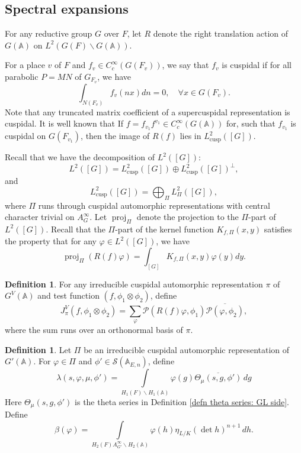 \documentclass[11pt, reqno]{amsart}
\numberwithin{equation}{subsection}
\theoremstyle{plain}
\theoremstyle{definition}
\newtheorem{definition}[proposition]{Definition}
\newcommand{\bs}{\backslash}
\renewcommand{\AA}{\mathbb A}
\newcommand{\ol}{\overline}
\renewcommand{\P}{\mathcal P}
\newcommand{\cS}{\mathcal S}
\begin{document}
\subsection{Spectral expansions}

For any reductive group $G$ over $F$, let $R$ denote the right translation action of
$G(\AA)$ on $L^2(G(F)\bs G(\AA))$.

For a place $v$ of $F$ and $f_{v} \in C_c^\infty(G(F_v))$, we say that $f_v$ is  cuspidal if for all parabolic $P=MN$ of $G_{F_v}$, we have
\[
    \int_{N(F_v)} f_v(nx) dn = 0, \quad \forall x \in G(F_v).
\]
Note that any truncated matrix coefficient of a supercuspidal representation is cuspidal. It is well known that  If $f = f_{v_1}f^{v_1} \in C_c^\infty(G(\AA))$ for, such that $f_{v_1}$ is cuspidal on $G(F_{v_1})$, then the image of $R(f)$ lies in $L^2_{\mathrm{cusp}}([G])$. 

Recall that we have the decomposition of $L^2([G])$:
\[
    L^2([G]) = L^2_{\operatorname{cusp}}([G]) \oplus L^2_{\operatorname{cusp}}([G])^\perp,
\]
and
\[
    L^2_{\operatorname{cusp}}([G]) = \bigoplus_{\Pi} L^2_\Pi([G]),
\]
where $\Pi$ runs through cuspidal automorphic representations with central character trivial on $A_{G}^\infty$. Let $\operatorname{proj}_{\Pi}$ denote the projection to the $\Pi$-part of $L^2([G])$. Recall that the $\Pi$-part of the kernel function $K_{f,\Pi}(x,y)$ satisfies the property that for any $\varphi \in L^2([G])$, we have
\[
    \operatorname{proj}_\Pi(R(f)\varphi) = \int_{[G]} K_{f,\Pi}(x,y) \varphi(y) dy.
\]


\begin{definition}
    For any irreducible cuspidal automorphic representation 
    $\pi$ of $G^V(\AA)$ and test function $(f, \phi_1 \otimes \phi_2)$,
    define
    \[
        J^V_\pi(f, \phi_1 \otimes \phi_2) 
        = \sum_{\varphi} \P(R(f)\varphi, \phi_1)\ol{\P(\varphi, \phi_2)},
    \]
    where the sum runs over an orthonormal basis of $\pi$.
\end{definition}

\begin{definition}
\label{def:globalzetaint}
Let $\Pi$ be an irreducible cuspidal automorphic
representation of $G'(\AA)$. 
For $\varphi \in \Pi$ and
$\phi' \in \cS(\AA_{E,n})$, define
\begin{equation}
        \lambda(s, \varphi, \mu, \phi') = \int\limits_{H_1(F)\bs H_1(\AA)} \varphi(g)\ol{\Theta_{\mu}(s, g, \phi')}\, dg
\end{equation}
Here $\Theta_{\mu}(s, g, \phi')$ is the theta series in Definition \ref{defn theta series: GL side}. Define
\begin{equation}
\beta(\varphi) = \int\limits_{H_2(F)A_{G'}^\infty \bs H_2(\AA)}
    \varphi(h)\eta_{L/K}(\det h)^{n+1}\, dh.
\end{equation}
\end{definition}
\end{document}
